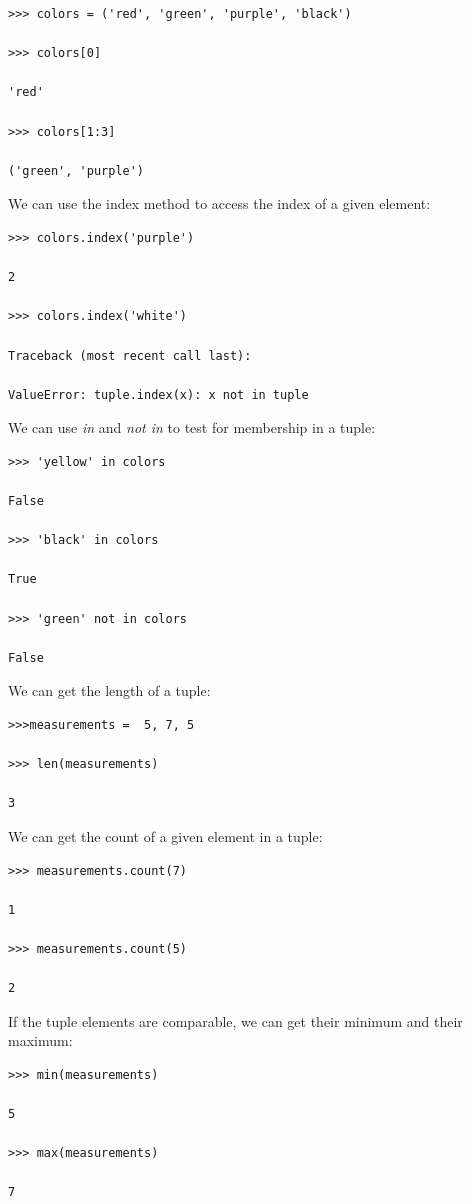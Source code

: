 \documentclass{article}
\begin{document}
\begin{lstlisting}
>>> colors = ('red', 'green', 'purple', 'black')

>>> colors[0]

'red'

>>> colors[1:3]

('green', 'purple')
\end{lstlisting}

We can use the index method to access the index of a given element:

\begin{lstlisting}
>>> colors.index('purple')

2

>>> colors.index('white')

Traceback (most recent call last):

ValueError: tuple.index(x): x not in tuple
\end{lstlisting}

We can use \textit{in} and \textit{not in} to test for membership in a tuple:
\begin{lstlisting}
>>> 'yellow' in colors

False

>>> 'black' in colors

True

>>> 'green' not in colors

False
\end{lstlisting}

We can get the length of a tuple:

\begin{lstlisting}
>>>measurements =  5, 7, 5

>>> len(measurements)

3
\end{lstlisting}

We can get the count of a given element in a tuple:  

\begin{lstlisting}
>>> measurements.count(7)

1

>>> measurements.count(5)

2
\end{lstlisting}

If the tuple elements are comparable, we can get their minimum and their maximum:

\begin{lstlisting}
>>> min(measurements)

5

>>> max(measurements)

7
\end{lstlisting}
\end{document}
